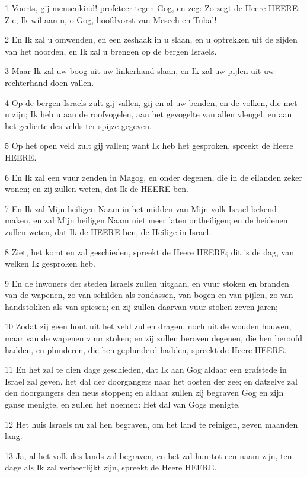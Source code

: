 \par 1 Voorts, gij mensenkind! profeteer tegen Gog, en zeg: Zo zegt de Heere HEERE: Zie, Ik wil aan u, o Gog, hoofdvorst van Mesech en Tubal!
\par 2 En Ik zal u omwenden, en een zeshaak in u slaan, en u optrekken uit de zijden van het noorden, en Ik zal u brengen op de bergen Israels.
\par 3 Maar Ik zal uw boog uit uw linkerhand slaan, en Ik zal uw pijlen uit uw rechterhand doen vallen.
\par 4 Op de bergen Israels zult gij vallen, gij en al uw benden, en de volken, die met u zijn; Ik heb u aan de roofvogelen, aan het gevogelte van allen vleugel, en aan het gedierte des velds ter spijze gegeven.
\par 5 Op het open veld zult gij vallen; want Ik heb het gesproken, spreekt de Heere HEERE.
\par 6 En Ik zal een vuur zenden in Magog, en onder degenen, die in de eilanden zeker wonen; en zij zullen weten, dat Ik de HEERE ben.
\par 7 En Ik zal Mijn heiligen Naam in het midden van Mijn volk Israel bekend maken, en zal Mijn heiligen Naam niet meer laten ontheiligen; en de heidenen zullen weten, dat Ik de HEERE ben, de Heilige in Israel.
\par 8 Ziet, het komt en zal geschieden, spreekt de Heere HEERE; dit is de dag, van welken Ik gesproken heb.
\par 9 En de inwoners der steden Israels zullen uitgaan, en vuur stoken en branden van de wapenen, zo van schilden als rondassen, van bogen en van pijlen, zo van handstokken als van spiesen; en zij zullen daarvan vuur stoken zeven jaren;
\par 10 Zodat zij geen hout uit het veld zullen dragen, noch uit de wouden houwen, maar van de wapenen vuur stoken; en zij zullen beroven degenen, die hen beroofd hadden, en plunderen, die hen geplunderd hadden, spreekt de Heere HEERE.
\par 11 En het zal te dien dage geschieden, dat Ik aan Gog aldaar een grafstede in Israel zal geven, het dal der doorgangers naar het oosten der zee; en datzelve zal den doorgangers den neus stoppen; en aldaar zullen zij begraven Gog en zijn ganse menigte, en zullen het noemen: Het dal van Gogs menigte.
\par 12 Het huis Israels nu zal hen begraven, om het land te reinigen, zeven maanden lang.
\par 13 Ja, al het volk des lands zal begraven, en het zal hun tot een naam zijn, ten dage als Ik zal verheerlijkt zijn, spreekt de Heere HEERE.
